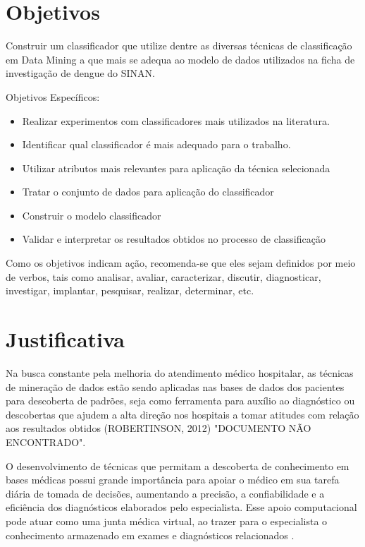 \documentclass[
	12pt,				%
	openright,			%
	oneside,	
	a4paper,				%
	english,				%
	brazil				%
]{abntex2/abntex2} %
\begin{document}
	\section{Objetivos}

		Construir um classificador que utilize dentre as diversas técnicas de classificação em Data Mining a que mais se adequa ao modelo de dados utilizados na ficha de investigação de dengue do SINAN.
		
		Objetivos Específicos:
		
		\begin{itemize}
			\item Realizar experimentos com classificadores mais utilizados na literatura.

			\item Identificar qual classificador é mais adequado para o trabalho.
			
			\item Utilizar atributos mais relevantes para aplicação da técnica selecionada
			
			\item Tratar o conjunto de dados para aplicação do classificador
			
			\item Construir o modelo classificador
			
			\item Validar e interpretar os resultados obtidos no processo de classificação
		\end{itemize}
		
		Como os objetivos indicam ação, recomenda-se que eles sejam definidos por meio de verbos, tais como analisar, avaliar, caracterizar, discutir, diagnosticar, investigar, implantar, pesquisar, realizar, determinar, etc.
		
	\section{Justificativa}
	
	Na busca constante pela melhoria do atendimento médico hospitalar, as técnicas de mineração de dados estão sendo aplicadas nas bases de dados dos pacientes para descoberta de padrões, seja como ferramenta para auxílio ao diagnóstico ou descobertas que ajudem a alta direção nos hospitais a tomar atitudes com relação aos resultados obtidos (ROBERTINSON, 2012) "DOCUMENTO NÃO ENCONTRADO".
	
	O desenvolvimento de técnicas que permitam a descoberta de conhecimento em bases médicas possui grande importância para apoiar o médico em sua tarefa diária de tomada de decisões, aumentando a precisão, a confiabilidade e a eficiência dos diagnósticos elaborados pelo especialista. Esse apoio computacional pode atuar como uma junta médica virtual, ao trazer para o especialista o conhecimento armazenado em exames e diagnósticos relacionados \cite{costa:2012}.
	
\end{document}

